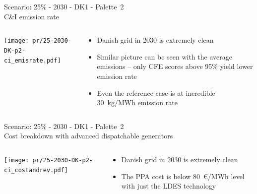 \begin{frame}{Scenario: 25\% - 2030 - DK1 - Palette~2 \\ 
C\&I emission rate}

\begin{columns}[T]
\begin{column}{9cm}
\centering

\texttt{[image: pr/25-2030-DK-p2-ci\_emisrate.pdf]}
\end{column}
\begin{column}{5cm}

\begin{itemize}
  \item Danish grid in 2030 is \alert{extremely clean}
  \item Similar picture can be seen with the average emissions -- only \alert{CFE scores above 95\%} yield lower emission rate
  \item Even the reference case is at incredible 30~kg/MWh emission rate
\end{itemize}
  
\end{column}
\end{columns}

\end{frame}


\begin{frame}{Scenario: 25\% - 2030 - DK1 - Palette~2 \\ 
Cost breakdown with advanced dispatchable generators}

\begin{columns}[T]
\begin{column}{9cm}
\centering

\texttt{[image: pr/25-2030-DK-p2-ci\_costandrev.pdf]}
\end{column}
\begin{column}{5cm}

\begin{itemize}
  \item Danish grid in 2030 is \alert{extremely clean}
  \item The PPA cost is below 80~€/MWh level with just the LDES technology
\end{itemize}
  
\end{column}
\end{columns}

\end{frame}


